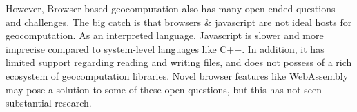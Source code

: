 However, Browser-based geocomputation also has many open-ended questions and challenges. 
The big catch is that browsers \& javascript are not ideal hosts for geocomputation. 
As an interpreted language, Javascript is slower and more imprecise compared to system-level languages like C++.
In addition, it has limited support regarding reading and writing files, and does not possess of a rich ecosystem of geocomputation libraries.  
Novel browser features like WebAssembly may pose a solution to some of these open questions, but this has not seen substantial research. 






